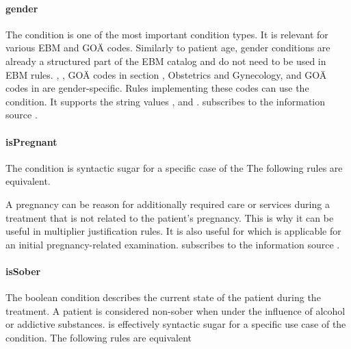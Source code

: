 \paragraph{gender}
The  condition is one of the most important condition types.
It is relevant for various EBM and GOÄ codes.
Similarly to patient age, gender conditions are already a structured part of the EBM catalog and do not need to be used in EBM rules.
, ,  GOÄ codes in section , Obstetrics and Gynecology, and GOÄ codes in  are gender-specific.
Rules implementing these codes can use the  condition.
It supports the string values ,  and .
 subscribes to the information source .


\paragraph{isPregnant}
The  condition is syntactic sugar for a specific case of the 
The following rules are equivalent.



A pregnancy can be reason for additionally required care or services during a treatment that is not related to the patient's pregnancy.
This is why it can be useful in multiplier justification rules.
It is also useful for  which is applicable for an initial pregnancy-related examination.
 subscribes to the information source .

\paragraph{isSober}
The  boolean condition describes the current state of the patient during the treatment.
A patient is considered non-sober when under the influence of alcohol or addictive substances.
 is effectively syntactic sugar for a specific use case of the  condition.
The following rules are equivalent



